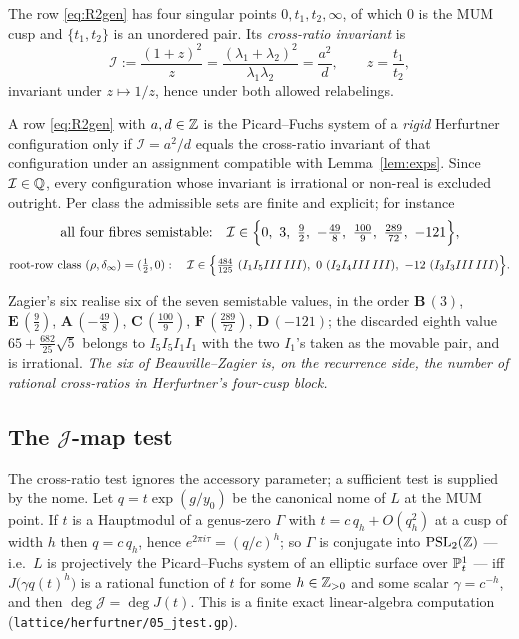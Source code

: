\begin{definition}\label{def:crossinv}
The row \eqref{eq:R2gen} has four singular points $0,t_1,t_2,\infty$, of which
$0$ is the MUM cusp and $\{t_1,t_2\}$ is an unordered pair. Its
\emph{cross-ratio invariant} is
\[
\mathcal I:=\frac{(1+z)^2}{z}=\frac{(\lambda_1+\lambda_2)^2}{\lambda_1\lambda_2}
=\frac{a^2}{d},\qquad z=\frac{t_1}{t_2} ,
\]
invariant under $z\mapsto1/z$, hence under both allowed relabelings.
\end{definition}

\begin{theorem}[finiteness]\label{thm:finite}
\Proved{} A row \eqref{eq:R2gen} with $a,d\in\mathbb{Z}$ is the Picard--Fuchs system of a
\emph{rigid} Herfurtner configuration only if $\mathcal I=a^2/d$ equals the
cross-ratio invariant of that configuration under an assignment compatible with
Lemma~\ref{lem:exps}. Since $\mathcal I\in\mathbb{Q}$, every configuration whose
invariant is irrational or non-real is excluded outright. Per class the
admissible sets are finite and explicit; for instance
\[
\text{all four fibres semistable:}\quad
\mathcal I\in\Bigl\{0,\ 3,\ \tfrac92,\ -\tfrac{49}8,\ \tfrac{100}9,\
\tfrac{289}{72},\ -121\Bigr\},
\]
\[
\text{root-row class }(\rho,\delta_\infty)=(\tfrac12,0):\quad
\mathcal I\in\Bigl\{\tfrac{484}{125}\ (I_1I_5III\,III),\ 0\ (I_2I_4III\,III),\
-12\ (I_3I_3III\,III)\Bigr\}.
\]
\end{theorem}

Zagier's six realise six of the seven semistable values, in the order
$\mathbf B\,(3)$, $\mathbf E\,(\tfrac92)$, $\mathbf A\,(-\tfrac{49}8)$,
$\mathbf C\,(\tfrac{100}9)$, $\mathbf F\,(\tfrac{289}{72})$,
$\mathbf D\,(-121)$; the discarded eighth value $65+\tfrac{682}{25}\sqrt5$
belongs to $I_5I_5I_1I_1$ with the two $I_1$'s taken as the movable pair, and is
irrational. \emph{The six of Beauville--Zagier is, on the recurrence side, the
number of rational cross-ratios in Herfurtner's four-cusp block.}

\subsection{The $\mathcal J$-map test}

The cross-ratio test ignores the accessory parameter; a sufficient test is
supplied by the nome. Let $q=t\exp(g/y_0)$ be the canonical nome of $L$ at the
MUM point. If $t$ is a Hauptmodul of a genus-zero $\Gamma$ with
$t=c\,q_h+O(q_h^2)$ at a cusp of width $h$ then $q=c\,q_h$, hence
$e^{2\pi i\tau}=(q/c)^h$; so $\Gamma$ is conjugate into $\operatorname{PSL}_2(\mathbb{Z})$ --- i.e.\
$L$ is projectively the Picard--Fuchs system of an elliptic surface over
$\mathbb{P}^1_t$ --- iff $J\bigl(\gamma q(t)^h\bigr)$ is a rational function of $t$ for
some $h\in\mathbb{Z}_{>0}$ and some scalar $\gamma=c^{-h}$, and then
$\deg\mathcal J=\deg J(t)$. This is a finite exact linear-algebra computation
(\texttt{lattice/herfurtner/05\_jtest.gp}).

